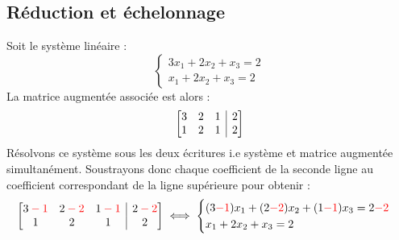 \documentclass{article}
\begin{document}
\subsection{Réduction et échelonnage}
\noindent Soit le système linéaire :
$$\begin{cases}
3x_1 + 2x_2 + x_3 = 2\\
x_1 + 2x_2 + x_3 = 2
\end{cases}
$$
La matrice augmentée associée est alors :
$$ 
\left[
\begin{array}{@{}ccc|c@{}}
3 & 2 & 1 & 2 \\
1 & 2 & 1 & 2 \\
\end{array}
\right]
$$
Résolvons ce système sous les deux écritures i.e système et matrice augmentée simultanément. Soustrayons donc chaque coefficient de la seconde ligne au coefficient correspondant de la ligne supérieure pour obtenir :
$$ 
\left[
\begin{array}{@{}ccc|c@{}}
3 \color{red} - 1 & 2 \color{red} -2 & 1  \color{red} - 1 & 2 \color{red} - 2 \\
1 & 2 & 1 & 2 \\
\end{array}
\right] 
\iff 
\begin{cases}
(3\textcolor{red}{-1})x_1 + (2\textcolor{red}{-2})x_2 + (1\textcolor{red}{-1})x_3 = 2\textcolor{red}{-2}\\
x_1 + 2x_2 + x_3 = 2
\end{cases}
$$
\end{document}
